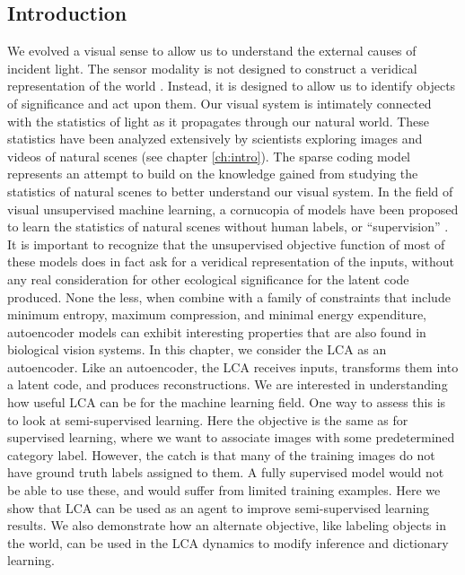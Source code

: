 \subsection{Introduction}
We evolved a visual sense to allow us to understand the external causes of incident light. The sensor modality is not designed to construct a veridical representation of the world \parencite{gollisch2010eye}. Instead, it is designed to allow us to identify objects of significance and act upon them. Our visual system is intimately connected with the statistics of light as it propagates through our natural world. These statistics have been analyzed extensively by scientists exploring images and videos of natural scenes (see chapter \ref{ch:intro}). The sparse coding model represents an attempt to build on the knowledge gained from studying the statistics of natural scenes to better understand our visual system. In the field of visual unsupervised machine learning, a cornucopia of models have been proposed to learn the statistics of natural scenes without human labels, or ``supervision'' \parencite{baldi2012autoencoders, bengio2012unsupervised, goodfellow2016deep}. It is important to recognize that the unsupervised objective function of most of these models does in fact ask for a veridical representation of the inputs, without any real consideration for other ecological significance for the latent code produced. None the less, when combine with a family of constraints that include minimum entropy, maximum compression, and minimal energy expenditure, autoencoder models can exhibit interesting properties that are also found in biological vision systems. In this chapter, we consider the LCA as an autoencoder. Like an autoencoder, the LCA receives inputs, transforms them into a latent code, and produces reconstructions. We are interested in understanding how useful LCA can be for the machine learning field. One way to assess this is to look at semi-supervised learning. Here the objective is the same as for supervised learning, where we want to associate images with some predetermined category label. However, the catch is that many of the training images do not have ground truth labels assigned to them. A fully supervised model would not be able to use these, and would suffer from limited training examples. Here we show that LCA can be used as an agent to improve semi-supervised learning results. We also demonstrate how an alternate objective, like labeling objects in the world, can be used in the LCA dynamics to modify inference and dictionary learning.


